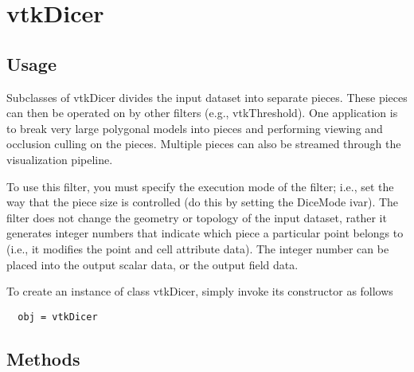 \section{vtkDicer}

\subsection{Usage}

 Subclasses of vtkDicer divides the input dataset into separate
 pieces.  These pieces can then be operated on by other filters
 (e.g., vtkThreshold). One application is to break very large
 polygonal models into pieces and performing viewing and occlusion
 culling on the pieces. Multiple pieces can also be streamed through
 the visualization pipeline.

 To use this filter, you must specify the execution mode of the
 filter; i.e., set the way that the piece size is controlled (do
 this by setting the DiceMode ivar). The filter does not change the
 geometry or topology of the input dataset, rather it generates
 integer numbers that indicate which piece a particular point
 belongs to (i.e., it modifies the point and cell attribute
 data). The integer number can be placed into the output scalar
 data, or the output field data.

To create an instance of class vtkDicer, simply
invoke its constructor as follows
\begin{verbatim}
  obj = vtkDicer
\end{verbatim}
\subsection{Methods}

